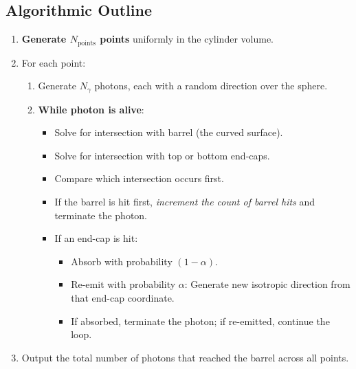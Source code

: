 \documentclass[11pt]{article}
\begin{document}
\subsection{Algorithmic Outline}
\begin{enumerate}
\item \textbf{Generate $N_{\mathrm{points}}$ points} uniformly in the cylinder volume.
\item For each point:
  \begin{enumerate}
    \item Generate $N_{\gamma}$ photons, each with a random direction over the sphere.
    \item \textbf{While photon is alive}:
      \begin{itemize}
        \item Solve for intersection with barrel (the curved surface).
        \item Solve for intersection with top or bottom end-caps.
        \item Compare which intersection occurs first.
        \item If the barrel is hit first, \emph{increment the count of barrel hits} and terminate the photon.
        \item If an end-cap is hit:
          \begin{itemize}
            \item Absorb with probability $(1-\alpha)$.
            \item Re-emit with probability $\alpha$: Generate new isotropic direction from that end-cap coordinate.
            \item If absorbed, terminate the photon; if re-emitted, continue the loop.
          \end{itemize}
      \end{itemize}
    \end{enumerate}
\item Output the total number of photons that reached the barrel across all points.
\end{enumerate}
\end{document}
